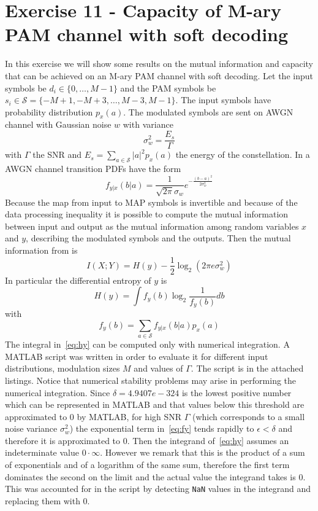 \documentclass[10pt]{article}
\begin{document}
\section*{Exercise 11 - Capacity of M-ary PAM channel with soft decoding}
In this exercise we will show some results on the mutual information and capacity that can be achieved on an M-ary PAM channel with soft decoding. 
Let the input symbols be $d_i \in \{0, \dots, M-1\}$ and the PAM symbols be $s_i \in \mathcal{S} = \{-M+1, -M+3, \dots, M-3, M-1\}$. The input symbols have probability distribution $p_x(a)$. The modulated symbols are sent on AWGN channel with Gaussian noise $w$ with variance
\begin{equation}
	\sigma_w^2 = \frac{E_s}{\Gamma}
\end{equation}
with $\Gamma$ the SNR and $E_s = \sum_{a \in \mathcal{S}} |a|^2 p_x(a)$ the energy of the constellation. In a AWGN channel transition PDFs have the form
\begin{equation}\label{eq:fy}
	f_{y|x}(b|a) = \frac{1}{\sqrt{2\pi}\sigma_w}e^{-\frac{(b-a)^2}{2\sigma_w^2}}
\end{equation}
Because the map from input to MAP symbols is invertible and because of the data processing inequality it is possible to compute the mutual information between input and output as the mutual information among random variables $x$ and $y$, describing the modulated symbols and the outputs.
Then the mutual information from \cite{erseghe} is
\begin{equation}
	I(X;Y) = H(y) - \frac{1}{2}\log_2(2\pi e\sigma_w^2)
\end{equation}
In particular the differential entropy of $y$ is
\begin{equation}\label{eq:hy}
	H(y) = \int f_y(b) \log_2\frac{1}{f_y(b)} db
\end{equation}
with
\begin{equation}
	f_y(b) = \sum_{a \in \mathcal{S}} f_{y|x}(b|a) p_x(a)
\end{equation}
The integral in~\eqref{eq:hy} can be computed only with numerical integration. A MATLAB script was written in order to evaluate it for different input distributions, modulation sizes $M$ and values of $\Gamma$. The script is in the attached listings. Notice that numerical stability problems may arise in performing the numerical integration. Since $\delta = 4.9407e-324$ is the lowest positive number which can be represented in MATLAB and that values below this threshold are approximated to $0$ by MATLAB, for high SNR $\Gamma$ (which corresponds to a small noise variance $\sigma_w^2$) the exponential term in~\eqref{eq:fy} tends rapidly to $\epsilon < \delta$ and therefore it is approximated to 0. Then the integrand of~\eqref{eq:hy} assumes an indeterminate value $0\cdot\infty$. However we remark that this is the product of a sum of exponentials and of a logarithm of the same sum, therefore the first term dominates the second on the limit and the actual value the integrand takes is 0. This was accounted for in the script by detecting \texttt{NaN} values in the integrand and replacing them with 0.
\end{document}
